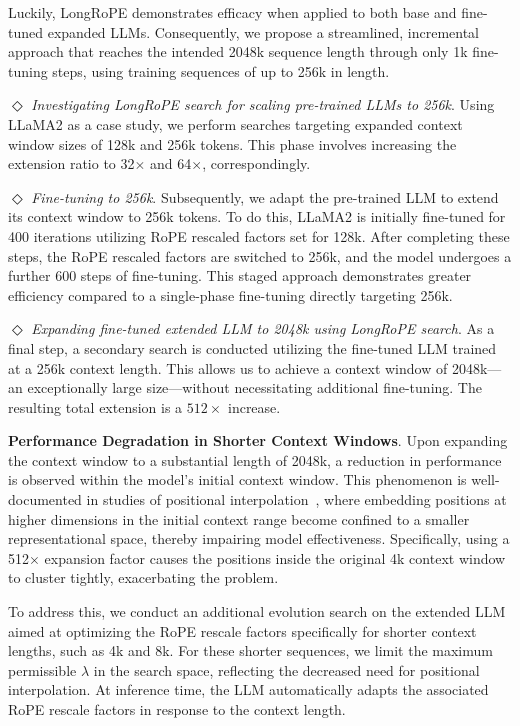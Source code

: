Luckily, LongRoPE demonstrates efficacy when applied to both base and fine-tuned expanded LLMs. Consequently, we propose a streamlined, incremental approach that reaches the intended 2048k sequence length through only 1k fine-tuning steps, using training sequences of up to 256k in length.

$\Diamond$ \textit{Investigating LongRoPE search for scaling pre-trained LLMs to 256k}. Using LLaMA2 as a case study, we perform searches targeting expanded context window sizes of 128k and 256k tokens. This phase involves increasing the extension ratio to 32$\times$ and 64$\times$, correspondingly.

$\Diamond$ \textit{Fine-tuning to 256k}. Subsequently, we adapt the pre-trained LLM to extend its context window to 256k tokens. To do this, LLaMA2 is initially fine-tuned for 400 iterations utilizing RoPE rescaled factors set for 128k. After completing these steps, the RoPE rescaled factors are switched to 256k, and the model undergoes a further 600 steps of fine-tuning. This staged approach demonstrates greater efficiency compared to a single-phase fine-tuning directly targeting 256k.

$\Diamond$ \textit{Expanding fine-tuned extended LLM to 2048k using LongRoPE search}. As a final step, a secondary search is conducted utilizing the fine-tuned LLM trained at a 256k context length. This allows us to achieve a context window of 2048k—an exceptionally large size—without necessitating additional fine-tuning. The resulting total extension is a $512\times$ increase.

\textbf{Performance Degradation in Shorter Context Windows}.  Upon expanding the context window to a substantial length of 2048k, a reduction in performance is observed within the model's initial context window. This phenomenon is well-documented in studies of positional interpolation~\cite{pi}, where embedding positions at higher dimensions in the initial context range become confined to a smaller representational space, thereby impairing model effectiveness. Specifically, using a 512$\times$ expansion factor causes the positions inside the original 4k context window to cluster tightly, exacerbating the problem.

To address this, we conduct an additional evolution search on the extended LLM aimed at optimizing the RoPE rescale factors specifically for shorter context lengths, such as 4k and 8k. For these shorter sequences, we limit the maximum permissible $\lambda$ in the search space, reflecting the decreased need for positional interpolation. At inference time, the LLM automatically adapts the associated RoPE rescale factors in response to the context length.


